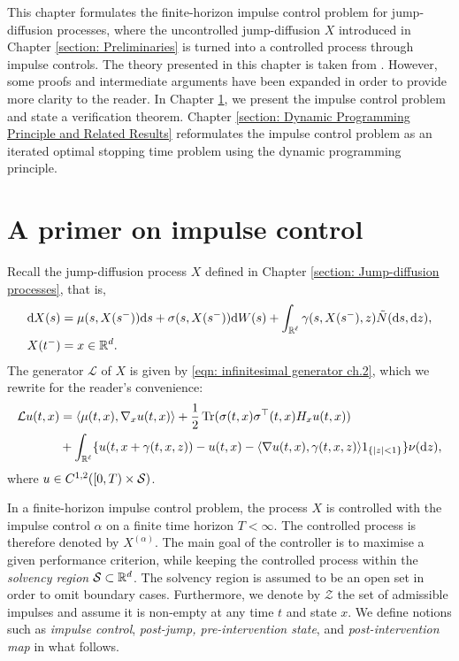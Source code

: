 \label{section: Impulse Control of Jump-Diffusion Processes}
This chapter formulates the finite-horizon impulse control problem for jump-diffusion processes, where the uncontrolled jump-diffusion $X$ introduced in Chapter \ref{section: Preliminaries} is turned into a controlled process through impulse controls. The theory presented in this chapter is taken from \cite[Chapters 9 and 10]{oksendal2007applied}. However, some proofs and intermediate arguments have been expanded in order to provide more clarity to the reader. In Chapter \ref{section: A Primer on Impulse Control Problems}, we present the impulse control problem and state a verification theorem. Chapter \ref{section: Dynamic Programming Principle and Related Results} reformulates the impulse control problem as an iterated optimal stopping time problem using the dynamic programming principle.

\section{A primer on impulse control}
\label{section: A Primer on Impulse Control Problems}
Recall the jump-diffusion process $X$ defined in Chapter \ref{section: Jump-diffusion processes}, that is, 
\begin{align}
    &\mathrm{d} X(s) = \mu(s,X(s^-)) \mathrm{d} s + \sigma(s, X(s^-)) \mathrm{d} W(s) + \int_{\mathbb R^\ell} \gamma (s,X(s^-),z) \tilde N (\mathrm{d} s, \mathrm{d} z), \nonumber \\
    &X(t^-) = x \in \mathbb{R}^d.
    \label{eqn: jump-diffusion SDE}
\end{align}
The generator $\mathcal L$ of $X$ is given by \eqref{eqn: infinitesimal generator ch.2}, which we rewrite for the reader's convenience:
\begin{align}
    \mathcal{L} u (t,x) &= \langle \mu(t,x), \nabla_x u (t,x) \rangle + \frac{1}{2} \operatorname{Tr} (\sigma(t,x)\sigma^\top(t,x)H_x u(t,x)) \nonumber\\
    &+ \int_{\mathbb{R}^\ell} \{u(t,x+\gamma(t,x,z)) - u (t,x) - \langle \nabla u (t,x), \gamma(t,x,z) \rangle 1_{\left\{|z|<1\right\}}\} \nu(\mathrm{d} z),
    \label{eqn: infinitesimal generator}
\end{align}
where $u \in C^{1,2}([0,T) \times \mathcal{S})$. 

In a finite-horizon impulse control problem, the process $X$ is controlled with the impulse control $\alpha$ on a finite time horizon $T<\infty$. The controlled process is therefore denoted by $X^{(\alpha)}$. The main goal of the controller is to maximise a given performance criterion, while keeping the controlled process within the \textit{solvency region} $\mathcal{S} \subset \mathbb{R}^d$. The solvency region is assumed to be an open set in order to omit boundary cases. Furthermore, we denote by $\mathcal Z$ the set of admissible impulses and assume it is non-empty at any time $t$ and state $x$. We define notions such as \emph{impulse control}, \emph{post-jump, pre-intervention state}, and \emph{post-intervention map} in what follows.
 
